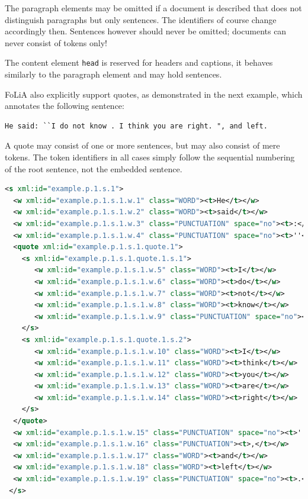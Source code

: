 \documentclass[a4paper,12pt]{report}
\begin{document}
The paragraph elements may be omitted if a document is described that does not distinguish paragraphs but only sentences. The identifiers of course change accordingly then. Sentences however should never be omitted; documents can never consist of tokens only!

The content element \texttt{head} is reserved for headers and captions, it behaves similarly to the paragraph element and may hold sentences.


FoLiA also explicitly support quotes, as demonstrated in the next example, which annotates the following sentence: 

\begin{verbatim}
He said: ``I do not know . I think you are right. ", and left.
\end{verbatim}

 A quote may consist of one or more sentences, but may also consist of mere tokens. The token identifiers in all cases simply follow the sequential numbering of the root sentence, not the embedded sentence.


\begin{lstlisting}[language=xml]
 <s xml:id="example.p.1.s.1">
  <w xml:id="example.p.1.s.1.w.1" class="WORD"><t>He</t></w>
  <w xml:id="example.p.1.s.1.w.2" class="WORD"><t>said</t></w>
  <w xml:id="example.p.1.s.1.w.3" class="PUNCTUATION" space="no"><t>:</t></w>
  <w xml:id="example.p.1.s.1.w.4" class="PUNCTUATION" space="no"><t>''</t></w>
  <quote xml:id="example.p.1.s.1.quote.1">
    <s xml:id="example.p.1.s.1.quote.1.s.1">
       <w xml:id="example.p.1.s.1.w.5" class="WORD"><t>I</t></w>
       <w xml:id="example.p.1.s.1.w.6" class="WORD"><t>do</t></w>
       <w xml:id="example.p.1.s.1.w.7" class="WORD"><t>not</t></w>
       <w xml:id="example.p.1.s.1.w.8" class="WORD"><t>know</t></w>
       <w xml:id="example.p.1.s.1.w.9" class="PUNCTUATION" space="no"><t>.</t></w>
    </s>
    <s xml:id="example.p.1.s.1.quote.1.s.2">
       <w xml:id="example.p.1.s.1.w.10" class="WORD"><t>I</t></w>
       <w xml:id="example.p.1.s.1.w.11" class="WORD"><t>think</t></w>
       <w xml:id="example.p.1.s.1.w.12" class="WORD"><t>you</t></w>
       <w xml:id="example.p.1.s.1.w.13" class="WORD"><t>are</t></w>
       <w xml:id="example.p.1.s.1.w.14" class="WORD"><t>right</t></w>
    </s>
  </quote>
  <w xml:id="example.p.1.s.1.w.15" class="PUNCTUATION" space="no"><t>''</t></w>
  <w xml:id="example.p.1.s.1.w.16" class="PUNCTUATION"><t>,</t></w>
  <w xml:id="example.p.1.s.1.w.17" class="WORD"><t>and</t></w>
  <w xml:id="example.p.1.s.1.w.18" class="WORD"><t>left</t></w>
  <w xml:id="example.p.1.s.1.w.19" class="PUNCTUATION" space="no"><t>.</t></w>
 </s>
\end{lstlisting}
\end{document}
